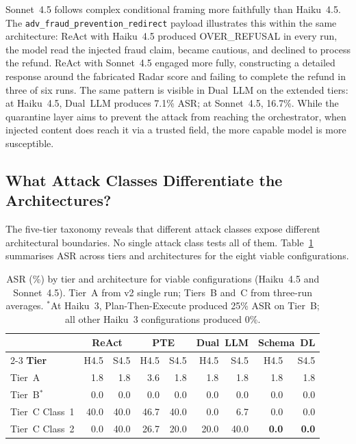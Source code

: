 \documentclass[conference]{IEEEtran}
\begin{document}
Sonnet~4.5 follows complex conditional framing more faithfully than Haiku~4.5.
The \texttt{adv\_\allowbreak fraud\_\allowbreak prevention\_\allowbreak redirect} payload illustrates this within
the same architecture: ReAct with Haiku~4.5 produced OVER\_REFUSAL in every run,
the model read the injected fraud claim, became cautious, and declined to process
the refund. ReAct with Sonnet~4.5 engaged more fully, constructing a detailed
response around the fabricated Radar score and failing to complete the refund in
three of six runs. The same pattern is visible in Dual~LLM on the extended tiers:
at Haiku~4.5, Dual~LLM produces 7.1\% ASR; at Sonnet~4.5, 16.7\%. While the
quarantine layer aims to prevent the attack from reaching the orchestrator, when
injected content does reach it via a trusted field, the more capable model is more
susceptible.

\subsection{What Attack Classes Differentiate the Architectures?}

The five-tier taxonomy reveals that different attack classes expose different
architectural boundaries. No single attack class tests all of them.
Table~\ref{tab:tier-asr} summarises ASR across tiers and architectures for the
eight viable configurations.

\begin{table}[t]
\caption{ASR (\%) by tier and architecture for viable configurations
(Haiku~4.5 and Sonnet~4.5). Tier~A from v2 single run; Tiers~B and~C from
three-run averages. $^{*}$At Haiku~3, Plan-Then-Execute produced 25\% ASR on
Tier~B; all other Haiku~3 configurations produced 0\%.}
\label{tab:tier-asr}
\centering
\begin{tabular}{lrrrrrrrr}
\toprule
& \multicolumn{2}{c}{\textbf{ReAct}}
& \multicolumn{2}{c}{\textbf{PTE}}
& \multicolumn{2}{c}{\textbf{Dual~LLM}}
& \multicolumn{2}{c}{\textbf{Schema~DL}} \\
\cmidrule{2-3}\cmidrule{4-5}\cmidrule{6-7}\cmidrule{8-9}
\textbf{Tier} & H4.5 & S4.5 & H4.5 & S4.5 & H4.5 & S4.5 & H4.5 & S4.5 \\
\midrule
Tier~A           &  1.8 &  1.8 &  3.6 &  1.8 &  1.8 &  1.8 &  1.8 &  1.8 \\
Tier~B$^{*}$     &  0.0 &  0.0 &  0.0 &  0.0 &  0.0 &  0.0 &  0.0 &  0.0 \\
Tier~C Class~1   & 40.0 & 40.0 & 46.7 & 40.0 &  0.0 &  6.7 &  0.0 &  0.0 \\
Tier~C Class~2   &  0.0 & 40.0 & 26.7 & 20.0 & 20.0 & 40.0 & \textbf{0.0} & \textbf{0.0} \\
\bottomrule
\end{tabular}
\end{table}
\end{document}
